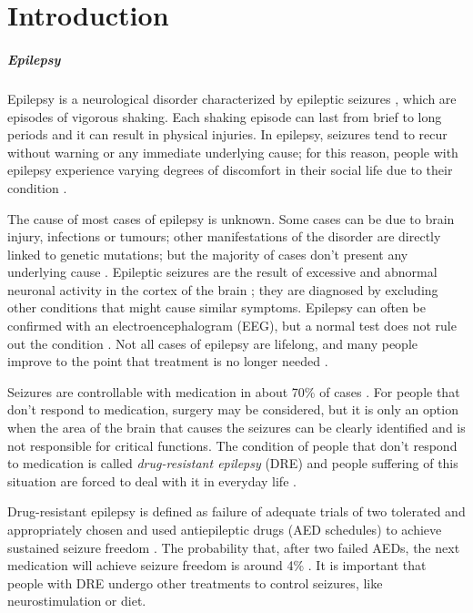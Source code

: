 
\chapter{Introduction} \label{chap: introduction}

\paragraph{Epilepsy} Epilepsy is a neurological disorder characterized by epileptic seizures \cite{NEJM:epilepsy}\cite{Epilepsia:epilepsy}, which are episodes of vigorous shaking. Each shaking episode can last from brief to long periods and it can result in physical injuries. In epilepsy, seizures tend to recur without warning or any immediate underlying cause; for this reason, people with epilepsy experience varying degrees of discomfort in their social life due to their condition \cite{WHO:epilepsy}.

The cause of most cases of epilepsy is unknown. Some cases can be due to brain injury, infections or tumours; other manifestations of the disorder are directly linked to genetic mutations; but the majority of cases don't present any underlying cause \cite{WHO:epilepsy}. Epileptic seizures are the result of excessive and abnormal neuronal activity in the cortex of the brain \cite{Epilepsia:epilepsy}; they are diagnosed by excluding other conditions that might cause similar symptoms. Epilepsy can often be confirmed with an electroencephalogram (EEG), but a normal test does not rule out the condition \cite{Hpim:seizuresandepilepsy}. Not all cases of epilepsy are lifelong, and many people improve to the point that treatment is no longer needed \cite{WHO:epilepsy}.

Seizures are controllable with medication in about 70\% of cases \cite{ERN:treatmentofepilepsy}. For people that don't respond to medication, surgery may be considered, but it is only an option when the area of the brain that causes the seizures can be clearly identified and is not responsible for critical functions. The condition of people that don't respond to medication is called \textit{drug-resistant epilepsy} (DRE) and people suffering of this situation are forced to deal with it in everyday life \cite{Epilepsia:DRE}.

Drug-resistant epilepsy is defined as failure of adequate trials of two tolerated and appropriately chosen and used antiepileptic drugs (AED schedules) to achieve sustained seizure freedom \cite{Epilepsia:DRE}. The probability that, after two failed AEDs, the next medication will achieve seizure freedom is around 4\% \cite{NEJM:DRE}. It is important that people with DRE undergo other treatments to control seizures, like neurostimulation or diet.


